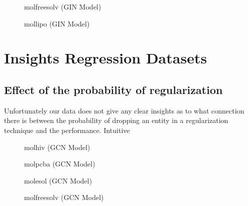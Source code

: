 \begin{figure}
    \centering
    \caption{molfreesolv (GIN Model)}
    \label{fig:gcn-molfreesolv}
\end{figure}

\begin{figure}
    \centering
    \caption{mollipo (GIN Model)}
    \label{fig:gcn-molfreesolv}
\end{figure}
\section{Insights Regression Datasets}


\subsection{Effect of the probability of regularization}
Unfortunately our data does not give any clear insights as to what connection there is between the probability of dropping an entity in a regularization technique and the performance. Intuitive


\begin{figure}
    \centering
    \caption{molhiv (GCN Model)}
    \label{fig:gcn-molfreesolv}
\end{figure}

\begin{figure}
    \centering
    \caption{molpcba (GCN Model)}
    \label{fig:gcn-molfreesolv}
\end{figure}

\begin{figure}
    \centering
    \caption{molesol (GCN Model)}
    \label{fig:gcn-molfreesolv}
\end{figure}

\begin{figure}
    \centering
    \caption{molfreesolv (GCN Model)}
    \label{fig:gcn-molfreesolv}
\end{figure}

